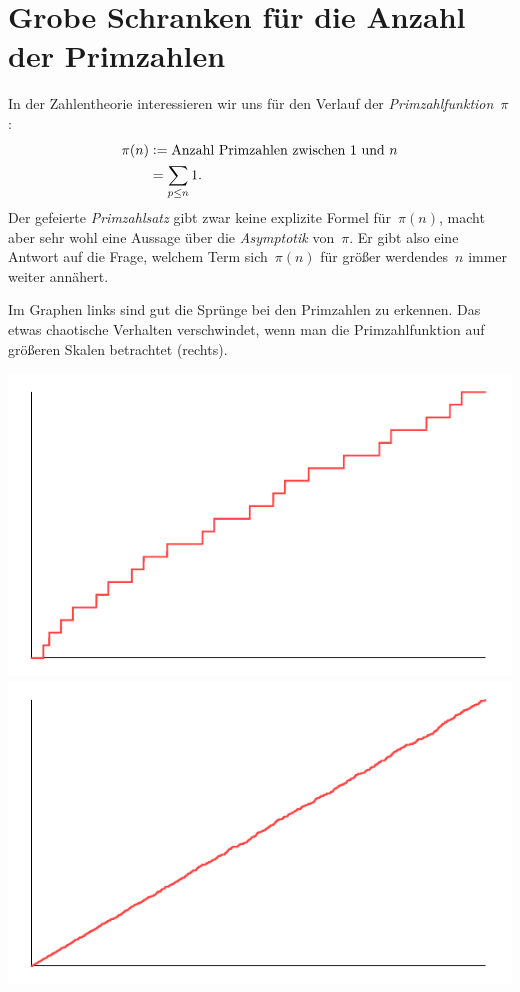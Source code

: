 \documentclass[twoside]{../zirkelblatt1415}
\theoremstyle{definition}
\theoremstyle{plain}
\theoremstyle{remark}
\newcommand{\defeq}{\vcentcolon=}
\begin{document}
\section{Grobe Schranken für die Anzahl der Primzahlen}

In der Zahlentheorie interessieren wir uns für den Verlauf der
\emph{Primzahlfunktion}~$\pi$:
\begin{align*}
  \pi(n) &\defeq \text{Anzahl Primzahlen zwischen $1$ und $n$} \\
  &= \sum_{p \leq n} 1.
\end{align*}
Der gefeierte \emph{Primzahlsatz} gibt zwar keine explizite Formel für~$\pi(n)$,
macht aber sehr wohl eine Aussage über die \emph{Asymptotik} von~$\pi$. Er gibt
also eine Antwort auf die Frage, welchem Term sich~$\pi(n)$ für größer
werdendes~$n$ immer weiter annähert.

Im Graphen links sind gut die Sprünge bei den Primzahlen zu erkennen. Das etwas
chaotische Verhalten verschwindet, wenn man die Primzahlfunktion auf größeren
Skalen betrachtet (rechts).

\begin{center}
  \includegraphics[scale=0.5]{pi-function-1}\qquad\qquad
  \includegraphics[scale=0.5]{pi-function-2}
\end{center}
\end{document}

